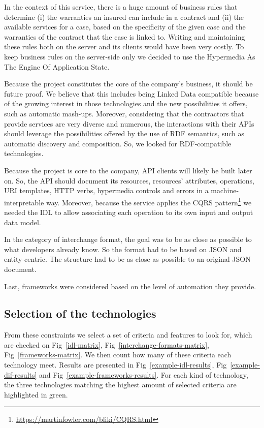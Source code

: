 In the context of this service, there is a huge amount of business rules that determine (i) the warranties an insured can include in a contract and (ii) the available services for a case, based on the specificity of the given case and the warranties of the contract that the case is linked to. Writing and maintaining these rules both on the server and its clients would have been very costly. To keep business rules on the server-side only we decided to use the Hypermedia As The Engine Of Application State.

Because the project constitutes the core of the company's business, it should be future proof. We believe that this includes being Linked Data compatible because of the growing interest in those technologies and the new possibilities it offers, such as automatic mash-ups. Moreover, considering that the contractors that provide services are very diverse and numerous, the interactions with their APIs should leverage the possibilities offered by the use of RDF semantics, such as automatic discovery and composition. So, we looked for RDF-compatible technologies.

Because the project is core to the company, API clients will likely be built later on. So, the API should document its resources, resources' attributes, operations, URI templates, HTTP verbs, hypermedia controls and errors in a machine-interpretable way. Moreover, because the service applies the CQRS pattern\footnote{\url{https://martinfowler.com/bliki/CQRS.html}} we needed the IDL to allow associating each operation to its own input and output data model.

In the category of interchange format, the goal was to be as close as possible to what developers already know. So the format had to be based on JSON and entity-centric. The structure had to be as close as possible to an original JSON document.

Last, frameworks were considered based on the level of automation they provide.

\subsection{Selection of the technologies}

From these constraints we select a set of criteria and features to look for, which are checked on Fig~\ref{idl-matrix}, Fig~\ref{interchange-formats-matrix}, Fig~\ref{frameworks-matrix}. We then count how many of these criteria each technology meet. Results are presented in Fig~\ref{example-idl-results}, Fig~\ref{example-dif-results} and Fig~\ref{example-frameworks-results}. For each kind of technology, the three technologies matching the highest amount of selected criteria are highlighted in green.

